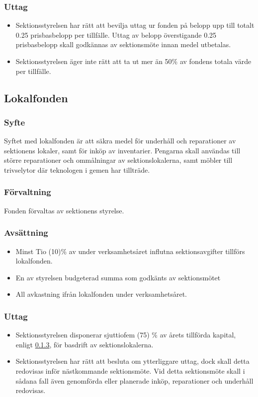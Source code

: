 \documentclass[a4paper, 10pt]{article}
\def\roundandprint #1{\xinttheiexpr #1\relax }
\newcommand{\prisbasbelopp}[1]{
    #1 prisbasbelopp
    \ifdef{\nuvarandeprisbasbelopp}{
        \marginpar{
            \small{ \textbf{\roundandprint{\xintiexpr#1 * \nuvarandeprisbasbelopp\relax}kr}}
        }
    }{}
}
\begin{document}
\subsubsection{Uttag}
\begin{itemize}
\item Sektionsstyrelsen har rätt att bevilja uttag ur fonden på belopp upp till totalt \prisbasbelopp{0.25} per tillfälle. Uttag av belopp överstigande \prisbasbelopp{0.25} skall godkännas av sektionsmöte innan medel utbetalas.
\item Sektionsstyrelsen äger inte rätt att ta ut mer än 50\% av fondens totala värde per tillfälle.
\end{itemize}

\subsection{Lokalfonden}
\subsubsection{Syfte}
\label{sec:lokalfond_syfte}
Syftet med lokalfonden är att säkra medel för underhåll och reparationer av sektionens lokaler, samt för inköp av inventarier. Pengarna skall användas till större reparationer och ommålningar av sektionslokalerna, samt möbler till trivselytor där teknologen i gemen har tillträde.
\subsubsection{Förvaltning}
Fonden förvaltas av sektionens styrelse.
\subsubsection{Avsättning}
\label{sec:lokalfond_avsattning}
\begin{itemize}
\item Minst Tio (10)\% av under verksamhetsåret influtna sektionsavgifter tillförs lokalfonden.
\item En av styrelsen budgeterad summa som godkänts av sektionsmötet
\item All avkastning ifrån lokalfonden under verksamhetsåret.
\end{itemize}
\subsubsection{Uttag}
\begin{itemize}
\item Sektionsstyrelsen disponerar sjuttiofem (75) \% av årets tillförda kapital,
enligt \ref{sec:lokalfond_avsattning}, för basdrift av sektionslokalerna.
\item Sektionsstyrelsen har rätt att besluta om ytterliggare uttag, dock skall detta redovisas inför nästkommande sektionsmöte. Vid detta sektionsmöte skall i sådana fall även genomförda eller planerade inköp, reparationer och underhåll redovisas.
\end{itemize}
\end{document}

